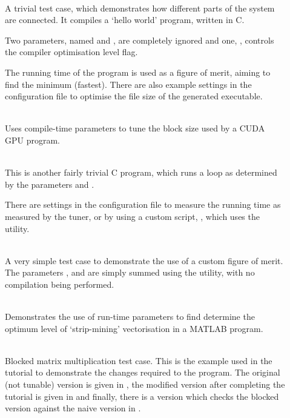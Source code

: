\documentclass[a4paper, draft]{article}
\begin{document}
\begin{description}
    
    \item[] \hfill \\
        A trivial test case, which demonstrates how different parts of the 
        system are connected. It compiles a `hello world' program, 
        written in C.
        
        Two parameters, named  and , are completely 
        ignored and one, , controls the compiler 
        optimisation level flag.
        
        The running time of the program is used as a figure of merit, aiming 
        to find the minimum (fastest). There are also example settings in the 
        configuration file to optimise the file size of the generated 
        executable.
        
    \item[] \hfill \\
        Uses compile-time parameters to tune the block size used by a CUDA GPU 
        program.
    
    \item[] \hfill \\
        This is another fairly trivial C program, which runs a loop as 
        determined by the parameters  and .
        
        There are settings in the configuration file to measure the running 
        time as measured by the tuner, or by using a custom script, 
        , which uses the  utility.
        
    \item[] \hfill \\
        A very simple test case to demonstrate the use of a custom figure of 
        merit. The parameters ,  and  are simply summed 
        using the  utility, with no compilation being performed.
        
    \item[] \hfill \\
        Demonstrates the use of run-time parameters to find determine the 
        optimum level of `strip-mining' vectorisation in a MATLAB program.
    
    \item[] \hfill \\
        Blocked matrix multiplication test case. This is the example used in 
        the tutorial to demonstrate the changes required to the program. The 
        original (not tunable) version is given in , 
        the modified version after completing the tutorial is given in 
         and finally, there is a version which 
        checks the blocked version against the naive version in 
        .
        
    
\end{description}
\end{document}
